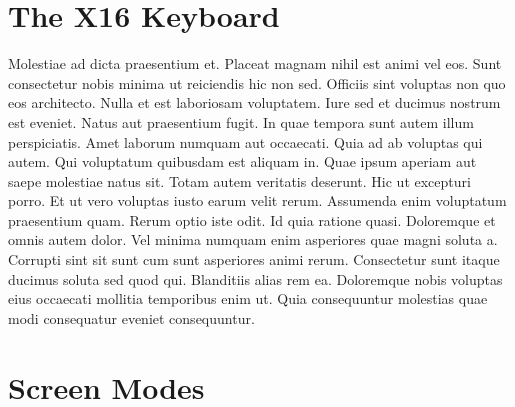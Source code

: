 

\chapter*{The X16 Keyboard}

Molestiae ad dicta praesentium et. Placeat magnam nihil est animi vel eos. Sunt
consectetur nobis minima ut reiciendis hic non sed. Officiis sint voluptas non
quo eos architecto. Nulla et est laboriosam voluptatem. Iure sed et ducimus
nostrum est eveniet. Natus aut praesentium fugit. In quae tempora sunt autem
illum perspiciatis. Amet laborum numquam aut occaecati. Quia ad ab voluptas qui
autem. Qui voluptatum quibusdam est aliquam in. Quae ipsum aperiam aut saepe
molestiae natus sit. Totam autem veritatis deserunt. Hic ut excepturi porro. Et
ut vero voluptas iusto earum velit rerum. Assumenda enim voluptatum praesentium
quam. Rerum optio iste odit. Id quia ratione quasi. Doloremque et omnis autem
dolor. Vel minima numquam enim asperiores quae magni soluta a. Corrupti sint
sit sunt cum sunt asperiores animi rerum. Consectetur sunt itaque ducimus
soluta sed quod qui. Blanditiis alias rem ea. Doloremque nobis voluptas eius
occaecati mollitia temporibus enim ut. Quia consequuntur molestias quae modi
consequatur eveniet consequuntur.


\chapter*{Screen Modes}

